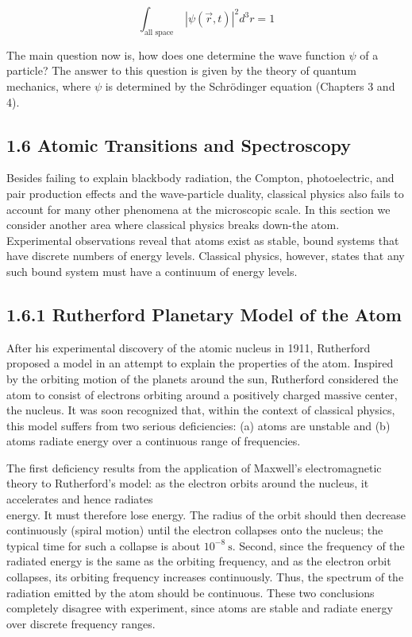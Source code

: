 \documentclass[10pt]{article}
\begin{document}
\begin{equation*}
\int_{\text {all space }}|\psi(\vec{r}, t)|^{2} d^{3} r=1 \tag{1.62}
\end{equation*}


The main question now is, how does one determine the wave function $\psi$ of a particle? The answer to this question is given by the theory of quantum mechanics, where $\psi$ is determined by the Schrödinger equation (Chapters 3 and 4).

\subsection*{1.6 Atomic Transitions and Spectroscopy}
Besides failing to explain blackbody radiation, the Compton, photoelectric, and pair production effects and the wave-particle duality, classical physics also fails to account for many other phenomena at the microscopic scale. In this section we consider another area where classical physics breaks down-the atom. Experimental observations reveal that atoms exist as stable, bound systems that have discrete numbers of energy levels. Classical physics, however, states that any such bound system must have a continuum of energy levels.

\subsection*{1.6.1 Rutherford Planetary Model of the Atom}
After his experimental discovery of the atomic nucleus in 1911, Rutherford proposed a model in an attempt to explain the properties of the atom. Inspired by the orbiting motion of the planets around the sun, Rutherford considered the atom to consist of electrons orbiting around a positively charged massive center, the nucleus. It was soon recognized that, within the context of classical physics, this model suffers from two serious deficiencies: (a) atoms are unstable and (b) atoms radiate energy over a continuous range of frequencies.

The first deficiency results from the application of Maxwell's electromagnetic theory to Rutherford's model: as the electron orbits around the nucleus, it accelerates and hence radiates\\
energy. It must therefore lose energy. The radius of the orbit should then decrease continuously (spiral motion) until the electron collapses onto the nucleus; the typical time for such a collapse is about $10^{-8} \mathrm{~s}$. Second, since the frequency of the radiated energy is the same as the orbiting frequency, and as the electron orbit collapses, its orbiting frequency increases continuously. Thus, the spectrum of the radiation emitted by the atom should be continuous. These two conclusions completely disagree with experiment, since atoms are stable and radiate energy over discrete frequency ranges.
\end{document}
